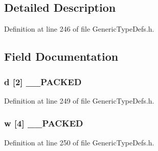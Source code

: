 \subsection{Detailed Description}


Definition at line 246 of file Generic\+Type\+Defs.\+h.



\subsection{Field Documentation}
\hypertarget{union_u_i_n_t64___v_a_l_a4f64eab2499d3a2aaf5335072c26dfd9}{}
\subsubsection[{\+\_\+\+\_\+\+P\+A\+C\+K\+E\+D}]{ d \mbox{[}2\mbox{]} {\bf \+\_\+\+\_\+\+P\+A\+C\+K\+E\+D}}\label{union_u_i_n_t64___v_a_l_a4f64eab2499d3a2aaf5335072c26dfd9}


Definition at line 249 of file Generic\+Type\+Defs.\+h.

\hypertarget{union_u_i_n_t64___v_a_l_ab63eec0f235e33631b3f77d76c82594f}{}
\subsubsection[{\+\_\+\+\_\+\+P\+A\+C\+K\+E\+D}]{ w \mbox{[}4\mbox{]} {\bf \+\_\+\+\_\+\+P\+A\+C\+K\+E\+D}}\label{union_u_i_n_t64___v_a_l_ab63eec0f235e33631b3f77d76c82594f}


Definition at line 250 of file Generic\+Type\+Defs.\+h.

\hypertarget{union_u_i_n_t64___v_a_l_a1200ea45452f549cdb4cfc2fa5d5842f}{}

